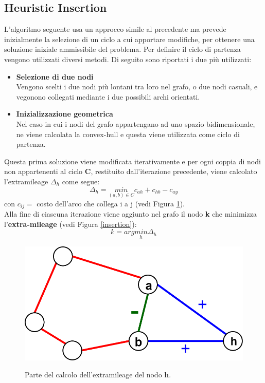 \subsection{Heuristic Insertion}
L'algoritmo seguente usa un approcco simile al precedente ma prevede inizialmente la selezione di un ciclo a cui apportare modifiche, per ottenere una soluzione iniziale ammissibile del problema. Per definire il ciclo di partenza vengono utilizzati diversi metodi. Di seguito sono riportati i due più utilizzati:
\begin{itemize}
\item{\textbf{Selezione di due nodi}\\
Vengono scelti i due nodi più lontani tra loro nel grafo, o due nodi casuali, e vegonono collegati mediante i due possibili archi orientati.
}
\item{\textbf{Inizializzazione geometrica}\\
Nel caso in cui i nodi del grafo appartengano ad uno spazio bidimensionale, ne viene calcolata la convex-hull e questa viene utilizzata come ciclo di partenza.
}
\end{itemize}
Questa prima soluzione viene modificata iterativamente e per ogni coppia di nodi non appartenenti al ciclo \textbf{C}, restituito dall'iterazione precedente, viene calcolato l'extramileage $\Delta_h$ come segue:
$$\Delta_h = \underset{(a,b)\in C}{min} c_{ah}+c_{hb}-c_{ay}$$
con $c_{ij}=$ costo dell'arco che collega i a j (vedi Figura \ref{partial_cycle}).\\
Alla fine di ciascuna iterazione viene aggiunto nel grafo il nodo \textbf{k} che minimizza l'\textbf{extra-mileage} (vedi Figura \ref{insertion}):\\
$$k = arg\underset{h}{min}\Delta_{h}$$
\begin{figure}[H] 
\begin{center} 
  \includegraphics[scale=0.3]{Images/partial_cycle}\\ 
  \caption{\footnotesize{Parte del calcolo dell'extramileage del nodo \textbf{h}.}}
  \label{partial_cycle}
\end{center}
\end{figure}
